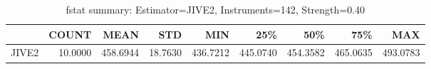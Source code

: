 \begin{table}[ht]
\centering
\caption{fstat summary: Estimator=JIVE2, Instruments=142, Strength=0.40}
\begin{tabular}{lrrrrrrrr}
\toprule
 & COUNT & MEAN & STD & MIN & 25\% & 50\% & 75\% & MAX \\
\midrule
JIVE2 & 10.0000 & 458.6944 & 18.7630 & 436.7212 & 445.0740 & 454.3582 & 465.0635 & 493.0783 \\
\bottomrule
\end{tabular}
\end{table}

